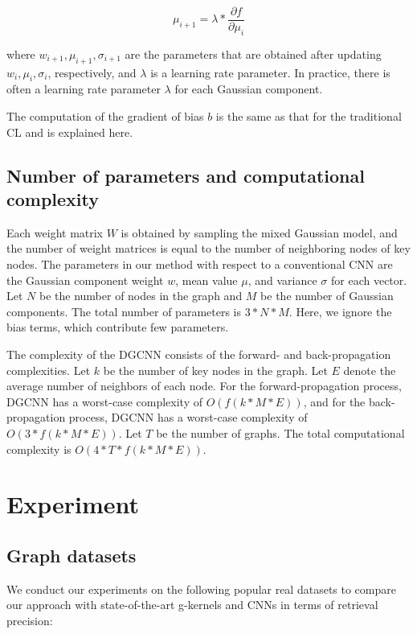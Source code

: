\documentclass[11pt]{article}
\begin{document}
\begin{equation}
\mu_{i+1} = \lambda*\frac{\partial f}{\partial \mu_i}
\end{equation}

where  $w_{i+1},\mu_{i+1},\sigma_{i+1}$ are the parameters that are obtained after updating $w_i,\mu_{i},\sigma_{i}$, respectively, and $\lambda$ is a learning rate parameter. In practice, there is often a learning rate parameter $\lambda$ for each Gaussian component.

The computation of the gradient of bias $b$ is the same as that for the traditional CL and is explained here.


\subsection{Number of parameters and computational complexity}
Each weight matrix $W$ is obtained by sampling the mixed Gaussian model, and the number of weight matrices is equal to the number of neighboring nodes of key nodes. The parameters in our method with respect to a conventional CNN are the Gaussian component weight $w$, mean value $\mu$, and variance $\sigma$ for each vector. Let $N$ be the number of nodes in the graph and $M$ be the number of Gaussian components. The total number of parameters is $3*N*M$. Here, we ignore the bias terms, which contribute few parameters.

The complexity of the DGCNN consists of the forward- and back-propagation complexities. Let $k$ be the number of key nodes in the graph. Let $E$ denote the average number of neighbors of each node. For the forward-propagation process, DGCNN has a worst-case complexity of $O(f(k*M*E))$, and for the back-propagation process, DGCNN has a worst-case complexity of $O(3*f(k *M*E))$. Let $T$ be the number of graphs. The total computational complexity is $O(4*T*f(k*M*E))$.

\section{Experiment}
\subsection{Graph datasets}

We conduct our experiments on the following popular real datasets to compare our approach with state-of-the-art g-kernels and CNNs in terms of retrieval precision:
\end{document}
